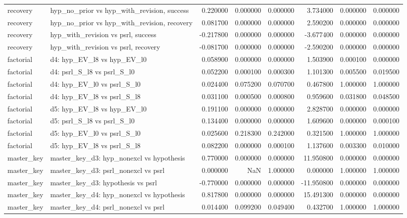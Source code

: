 \begin{tabular}{llrrrrrr}
recovery & hyp\_no\_prior vs hyp\_with\_revision, success & 0.220000 & 0.000000 & 0.000000 & 3.734000 & 0.000000 & 0.000000 \\
recovery & hyp\_no\_prior vs hyp\_with\_revision, recovery & 0.081700 & 0.000000 & 0.000000 & 2.590200 & 0.000000 & 0.000000 \\
recovery & hyp\_with\_revision vs psrl, success & -0.217800 & 0.000000 & 0.000000 & -3.677400 & 0.000000 & 0.000000 \\
recovery & hyp\_with\_revision vs psrl, recovery & -0.081700 & 0.000000 & 0.000000 & -2.590200 & 0.000000 & 0.000000 \\
factorial & d4: hyp\_EV\_l8 vs hyp\_EV\_l0 & 0.058900 & 0.000000 & 0.000000 & 1.503900 & 0.000100 & 0.000000 \\
factorial & d4: psrl\_S\_l8 vs psrl\_S\_l0 & 0.052200 & 0.000100 & 0.000300 & 1.101300 & 0.005500 & 0.019500 \\
factorial & d4: hyp\_EV\_l0 vs psrl\_S\_l0 & 0.024400 & 0.075200 & 0.070700 & 0.467800 & 1.000000 & 1.000000 \\
factorial & d4: hyp\_EV\_l8 vs psrl\_S\_l8 & 0.031100 & 0.000500 & 0.000800 & 0.959600 & 0.031800 & 0.048500 \\
factorial & d5: hyp\_EV\_l8 vs hyp\_EV\_l0 & 0.191100 & 0.000000 & 0.000000 & 2.828700 & 0.000000 & 0.000000 \\
factorial & d5: psrl\_S\_l8 vs psrl\_S\_l0 & 0.134400 & 0.000000 & 0.000000 & 1.609600 & 0.000000 & 0.000100 \\
factorial & d5: hyp\_EV\_l0 vs psrl\_S\_l0 & 0.025600 & 0.218300 & 0.242000 & 0.321500 & 1.000000 & 1.000000 \\
factorial & d5: hyp\_EV\_l8 vs psrl\_S\_l8 & 0.082200 & 0.000000 & 0.000100 & 1.137600 & 0.003300 & 0.010000 \\
master\_key & master\_key\_d3: hyp\_nonexcl vs hypothesis & 0.770000 & 0.000000 & 0.000000 & 11.950800 & 0.000000 & 0.000000 \\
master\_key & master\_key\_d3: psrl\_nonexcl vs psrl & 0.000000 & NaN & 1.000000 & 0.000000 & 1.000000 & 1.000000 \\
master\_key & master\_key\_d3: hypothesis vs psrl & -0.770000 & 0.000000 & 0.000000 & -11.950800 & 0.000000 & 0.000000 \\
master\_key & master\_key\_d4: hyp\_nonexcl vs hypothesis & 0.817800 & 0.000000 & 0.000000 & 15.491300 & 0.000000 & 0.000000 \\
master\_key & master\_key\_d4: psrl\_nonexcl vs psrl & 0.014400 & 0.099200 & 0.049400 & 0.432700 & 1.000000 & 1.000000 \\

\end{tabular}
